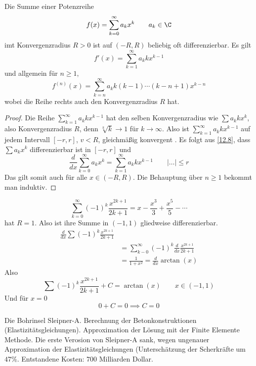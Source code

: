 \documentclass[a4paper,10pt]{scrbook}
\begin{document}
\begin{thm}
\label{12.11}
Die Summe einer Potenzreihe
\[
f(x)=\sum_{k=0}^\infty a_kx^k \qquad a_k\in\C
\]
imt Konvergenzradius $R>0$ ist auf $(-R,R)$ beliebig oft differenzierbar.
Es gilt
\[
f'(x)=\sum_{k=1}^\infty a_kkx^{k-1}
\]
und allgemein für $n\ge 1$,
\[
f^{(n)}(x)=\sum_{k=n}^\infty a_k k(k-1)\dotsb (k-n+1)x^{k-n}
\]
wobei die Reihe rechts auch den Konvergenzradius $R$ hat.
\begin{proof}
Die Reihe $\sum_{k=1}^\infty a_kkx^{k-1}$ hat den selben Konvergenzradius wie $\sum a_kkx^k$, also Konvergenzradius $R$, denn $\sqrt[k]{k}\to 1$ für $k\to\infty$.
Also ist $\sum_{k=1}^\infty a_kkx^{k-1}$ auf jedem Intervall $[-r,r]$, $v<R$, gleichmäßig konvergent
.
Es folgt aus \ref{12.8}, dass $\sum a_kx^k$ differenzierbar ist in $[-r,r]$ und
\[
\frac d{dx}\sum_{k=0}^\infty a_kx^k=\sum_{k=1}^\infty a_kkx^{k-1} \qquad |…|\le r
\]
Das gilt somit auch für alle $x\in (-R,R)$.
Die Behauptung über $n\ge 1$ bekommt man induktiv.
\end{proof}
\begin{ex*}
\[
\sum_{k=0}^\infty (-1)^k\frac{x^{2k+1}}{2k+1}=x-\frac{x^3}3 +\frac{x^5}5-\dotsb
\]
hat $R=1$. Also ist ihre Summe in $(-1,1)$ gliedweise differenzierbar.
\begin{align*}
\frac d{dx} \sum (-1)^k \frac{x^{2k+1}}{2k+1} \\
&= \sum_{k-0}^\infty (-1)^k\frac d{dx} \frac {x^{2k+1}}{2k+1}\\
&= \frac 1{1+x^2} = \frac d{dx} \arctan(x)
\end{align*}
Also
\[
\sum (-1)^k\frac{x^{2k+1}}{2k+1}+C=\arctan(x) \qquad x\in (-1,1)
\]
Und für $x=0$
\[
0+C = 0 \implies C=0
\]
\end{ex*}
\end{thm}

\begin{note}
Die Bohrinsel Sleipner-A.
Berechnung der Betonkonstruktionen (Elastizitätsgleichungen).
Approximation der Lösung mit der Finite Elemente Methode.
Die erste Verosion von Sleipner-A sank, wegen ungenauer Approximation der Elastizitätsgleichungen (Unterschätzung der Scherkräfte um $47\%$.
Entstandene Kosten: $700$ Milliarden Dollar.
\end{note}
\begin{note}
\end{note}
\end{document}
